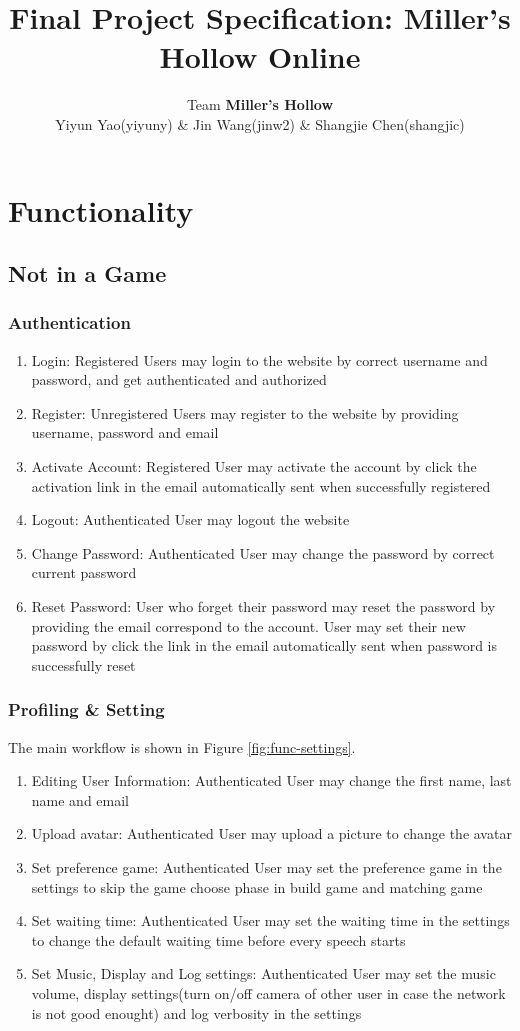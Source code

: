 \documentclass[11pt]{article}
\title{Final Project Specification: Miller's Hollow Online}
\author{Team \textbf{Miller's Hollow}
\\Yiyun Yao(yiyuny) \& Jin Wang(jinw2) \& Shangjie Chen(shangjic)}
\date{}                                           %
\begin{document}
\maketitle

\section{Functionality}
\subsection{Not in a Game}
\subsubsection{Authentication}
\begin{enumerate}
\item
Login: Registered Users may login to the website by correct username and password, and get authenticated and authorized
\item
Register: Unregistered Users may register to the website by providing username, password and email
\item
Activate Account: Registered User may activate the account by click the activation link in the email automatically sent when successfully registered
\item
Logout: Authenticated User may logout the website
\item
Change Password: Authenticated User may change the password by correct current password
\item
Reset Password: User who forget their password may reset the password by providing the email correspond to the account. User may set their new password by click the link in the email automatically sent when password is successfully reset
\end{enumerate}

\subsubsection{Profiling \& Setting}
The main workflow is shown in Figure \ref{fig:func-settings}.

\begin{enumerate}
\item
Editing User Information: Authenticated User may change the first name, last name and email
\item
Upload avatar: Authenticated User may upload a picture to change the avatar
\item
Set preference game: Authenticated User may set the preference game in the settings to skip the game choose phase in build game and matching game
\item
Set waiting time: Authenticated User may set the waiting time in the settings to change the default waiting time before every speech starts
\item
Set Music, Display and Log settings: Authenticated User may set the music volume, display settings(turn on/off camera of other user in case the network is not good enought) and log verbosity in the settings
\end{enumerate}
\end{document}
